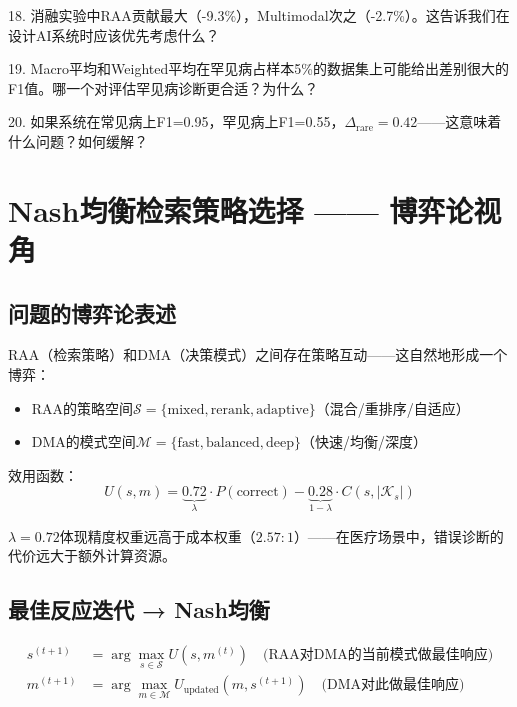 \documentclass[11pt,a4paper]{ctexart}
\begin{document}
\begin{exerbox}[思考题 18--20]
18. 消融实验中RAA贡献最大（-9.3\%），Multimodal次之（-2.7\%）。这告诉我们在设计AI系统时应该优先考虑什么？

19. Macro平均和Weighted平均在罕见病占样本5\%的数据集上可能给出差别很大的F1值。哪一个对评估罕见病诊断更合适？为什么？

20. 如果系统在常见病上F1=0.95，罕见病上F1=0.55，$\Delta_{\text{rare}}=0.42$——这意味着什么问题？如何缓解？
\end{exerbox}

\newpage

\section{Nash均衡检索策略选择 —— 博弈论视角}

\subsection{问题的博弈论表述}

RAA（检索策略）和DMA（决策模式）之间存在策略互动——这自然地形成一个博弈：

\begin{itemize}[nosep]
\item RAA的策略空间$\mathcal{S} = \{\text{mixed}, \text{rerank}, \text{adaptive}\}$（混合/重排序/自适应）
\item DMA的模式空间$\mathcal{M} = \{\text{fast}, \text{balanced}, \text{deep}\}$（快速/均衡/深度）
\end{itemize}

效用函数：
$$U(s, m) = \underbrace{0.72}_{\lambda} \cdot P(\text{correct}) - \underbrace{0.28}_{1-\lambda} \cdot C(s, |\mathcal{K}_s|)$$

$\lambda=0.72$体现精度权重远高于成本权重（$2.57:1$）——在医疗场景中，错误诊断的代价远大于额外计算资源。

\subsection{最佳反应迭代 → Nash均衡}

\begin{align}
s^{(t+1)} &= \arg\max_{s \in \mathcal{S}} U(s, m^{(t)}) \quad \text{(RAA对DMA的当前模式做最佳响应)}\\
m^{(t+1)} &= \arg\max_{m \in \mathcal{M}} U_{\text{updated}}(m, s^{(t+1)}) \quad \text{(DMA对此做最佳响应)}
\end{align}
\end{document}
